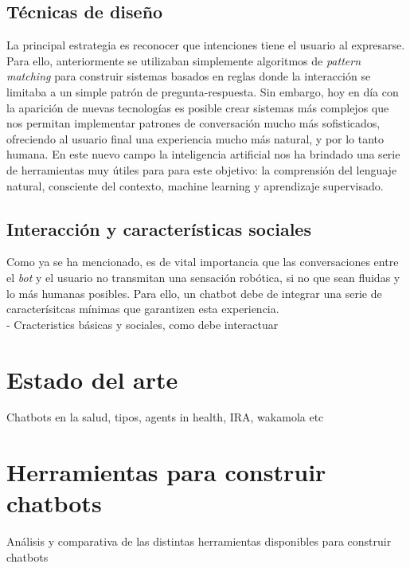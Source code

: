 \subsection{Técnicas de diseño }
La principal estrategia es reconocer que intenciones tiene el usuario al expresarse. Para ello, anteriormente se utilizaban simplemente algoritmos de \textit{pattern matching} para construir sistemas basados en reglas donde la interacción se limitaba a un simple patrón de pregunta-respuesta. Sin embargo, hoy en día con la aparición de nuevas tecnologías es posible crear sistemas más complejos que nos permitan implementar patrones de conversación mucho más sofisticados, ofreciendo al usuario final una experiencia mucho más natural, y por lo tanto humana. En este nuevo campo la inteligencia artificial nos ha brindado una serie de herramientas muy útiles para para este objetivo: la comprensión del lenguaje natural, consciente del contexto, machine learning y  aprendizaje supervisado. \\

\subsection{Interacción y características sociales}
Como ya se ha mencionado, es de vital importancia que las conversaciones entre el \textit{bot} y el usuario no transmitan una sensación robótica, si no que sean fluidas y lo más humanas posibles. Para ello, un chatbot debe de integrar una serie de caracterísitcas mínimas que garantizen esta experiencia.\\

- Cracteristics básicas y sociales, como debe interactuar

\section{Estado del arte}
Chatbots en la salud, tipos, agents in health, IRA, wakamola etc\\


\section{Herramientas para construir chatbots}
Análisis y comparativa de las distintas herramientas disponibles para construir chatbots

